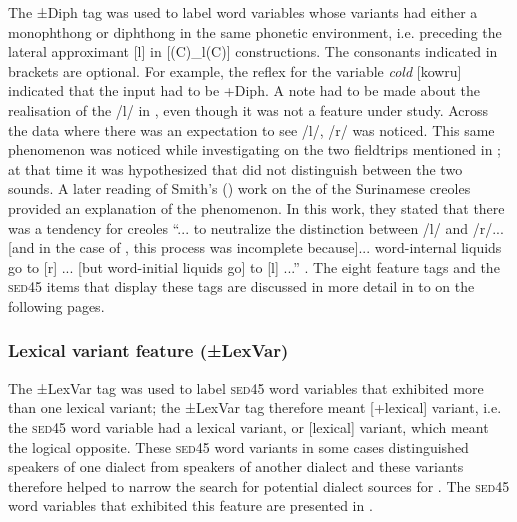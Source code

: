 {The {±Diph } tag was used to label word variables whose variants had either a monophthong or diphthong in the same phonetic environment, i.e. preceding the lateral approximant [l] in [(C){\_}l(C)] constructions. The consonants indicated in brackets are optional. For example, the  reflex for the variable  \emph{cold} [kowru] indicated that the input had to be +Diph. A note had to be made about the realisation of the /l/ in , even though it was not a feature under study. Across the data where there was an expectation to see /l/, /r/ was noticed. This same phenomenon was noticed while investigating  on the two fieldtrips mentioned in ; at that time it was hypothesized that  did not distinguish between the two sounds. A later reading of Smith's (\citeyear{Smith04}) work on the  of the Surinamese creoles provided an explanation of the phenomenon. In this work, they stated that there was a tendency for  creoles ``... to neutralize the distinction between /l/ and /r/... [and in the case of , this process was incomplete because]... word-internal liquids go to [r] ... [but word-initial liquids go] to [l] ...'' \citep[562]{Smith04}. The eight feature tags and the \textsc{sed45} items that display these tags are discussed in more detail in  to  on the following pages.

\subsubsection {Lexical variant feature (±LexVar)} \label{3.3.2.1}
The {±LexVar} tag was used to label \textsc{sed45} word variables that
exhibited more than one lexical variant; the ±LexVar tag therefore meant [+lexical] variant, i.e. the \textsc{sed45} word variable had a lexical variant, or [\textminus{}lexical] variant, which meant the logical opposite. These \textsc{sed45} word variants in some cases distinguished speakers of one dialect from speakers of another dialect and these variants therefore helped to narrow the search for potential dialect sources for . The \textsc{sed45} word variables that exhibited this feature are presented in .


}
